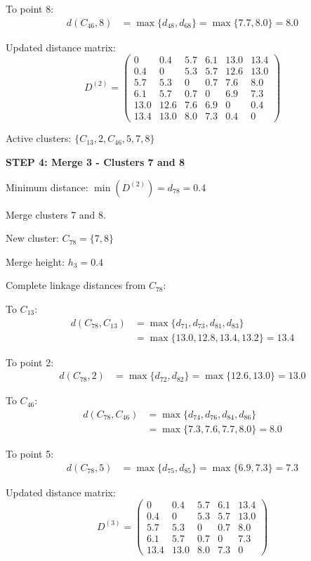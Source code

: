 \documentclass[12pt]{article}
\begin{document}
\begin{solution}
To point 8:
\begin{align*}
d(C_{46}, 8) &= \max\{d_{48}, d_{68}\} = \max\{7.7, 8.0\} = 8.0
\end{align*}

Updated distance matrix:
\[
D^{(2)} = \begin{pmatrix}
0 & 0.4 & 5.7 & 6.1 & 13.0 & 13.4 \\
0.4 & 0 & 5.3 & 5.7 & 12.6 & 13.0 \\
5.7 & 5.3 & 0 & 0.7 & 7.6 & 8.0 \\
6.1 & 5.7 & 0.7 & 0 & 6.9 & 7.3 \\
13.0 & 12.6 & 7.6 & 6.9 & 0 & 0.4 \\
13.4 & 13.0 & 8.0 & 7.3 & 0.4 & 0
\end{pmatrix}
\]

Active clusters: $\{C_{13}, 2, C_{46}, 5, 7, 8\}$

\textbf{STEP 4: Merge 3 - Clusters 7 and 8}

Minimum distance: $\min(D^{(2)}) = d_{78} = 0.4$

Merge clusters 7 and 8.

New cluster: $C_{78} = \{7, 8\}$

Merge height: $h_3 = 0.4$

Complete linkage distances from $C_{78}$:

To $C_{13}$:
\begin{align*}
d(C_{78}, C_{13}) &= \max\{d_{71}, d_{73}, d_{81}, d_{83}\} \\
&= \max\{13.0, 12.8, 13.4, 13.2\} = 13.4
\end{align*}

To point 2:
\begin{align*}
d(C_{78}, 2) &= \max\{d_{72}, d_{82}\} = \max\{12.6, 13.0\} = 13.0
\end{align*}

To $C_{46}$:
\begin{align*}
d(C_{78}, C_{46}) &= \max\{d_{74}, d_{76}, d_{84}, d_{86}\} \\
&= \max\{7.3, 7.6, 7.7, 8.0\} = 8.0
\end{align*}

To point 5:
\begin{align*}
d(C_{78}, 5) &= \max\{d_{75}, d_{85}\} = \max\{6.9, 7.3\} = 7.3
\end{align*}

Updated distance matrix:
\[
D^{(3)} = \begin{pmatrix}
0 & 0.4 & 5.7 & 6.1 & 13.4 \\
0.4 & 0 & 5.3 & 5.7 & 13.0 \\
5.7 & 5.3 & 0 & 0.7 & 8.0 \\
6.1 & 5.7 & 0.7 & 0 & 7.3 \\
13.4 & 13.0 & 8.0 & 7.3 & 0
\end{pmatrix}
\]


\end{solution}
\end{document}
